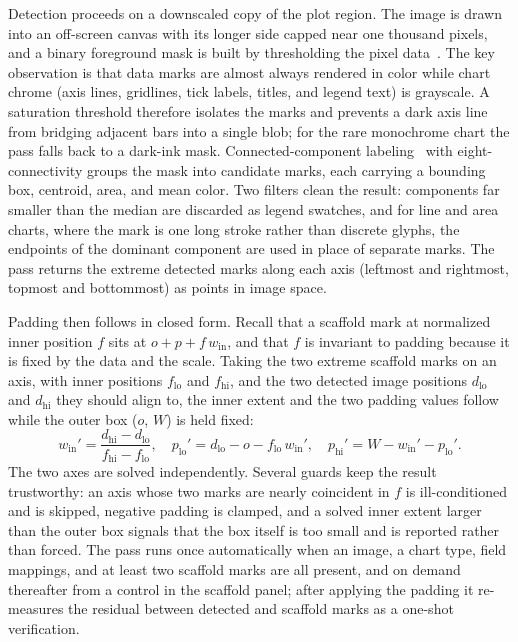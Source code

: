 \documentclass[12pt]{cmuthesis}
\begin{document}
Detection proceeds on a downscaled copy of the plot region. The image is drawn into an off-screen canvas with its longer side capped near one thousand pixels, and a binary foreground mask is built by thresholding the pixel data~\cite{Otsu1979}. The key observation is that data marks are almost always rendered in color while chart chrome (axis lines, gridlines, tick labels, titles, and legend text) is grayscale. A saturation threshold therefore isolates the marks and prevents a dark axis line from bridging adjacent bars into a single blob; for the rare monochrome chart the pass falls back to a dark-ink mask. Connected-component labeling~\cite{Rosenfeld1966} with eight-connectivity groups the mask into candidate marks, each carrying a bounding box, centroid, area, and mean color. Two filters clean the result: components far smaller than the median are discarded as legend swatches, and for line and area charts, where the mark is one long stroke rather than discrete glyphs, the endpoints of the dominant component are used in place of separate marks. The pass returns the extreme detected marks along each axis (leftmost and rightmost, topmost and bottommost) as points in image space.

Padding then follows in closed form. Recall that a scaffold mark at normalized inner position $f$ sits at $o + p + f\,w_{\mathrm{in}}$, and that $f$ is invariant to padding because it is fixed by the data and the scale. Taking the two extreme scaffold marks on an axis, with inner positions $f_{\mathrm{lo}}$ and $f_{\mathrm{hi}}$, and the two detected image positions $d_{\mathrm{lo}}$ and $d_{\mathrm{hi}}$ they should align to, the inner extent and the two padding values follow while the outer box ($o$, $W$) is held fixed:
\[
w_{\mathrm{in}}' = \frac{d_{\mathrm{hi}} - d_{\mathrm{lo}}}{f_{\mathrm{hi}} - f_{\mathrm{lo}}}, \quad
p_{\mathrm{lo}}' = d_{\mathrm{lo}} - o - f_{\mathrm{lo}}\,w_{\mathrm{in}}', \quad
p_{\mathrm{hi}}' = W - w_{\mathrm{in}}' - p_{\mathrm{lo}}'.
\]
The two axes are solved independently. Several guards keep the result trustworthy: an axis whose two marks are nearly coincident in $f$ is ill-conditioned and is skipped, negative padding is clamped, and a solved inner extent larger than the outer box signals that the box itself is too small and is reported rather than forced. The pass runs once automatically when an image, a chart type, field mappings, and at least two scaffold marks are all present, and on demand thereafter from a control in the scaffold panel; after applying the padding it re-measures the residual between detected and scaffold marks as a one-shot verification.
\end{document}
